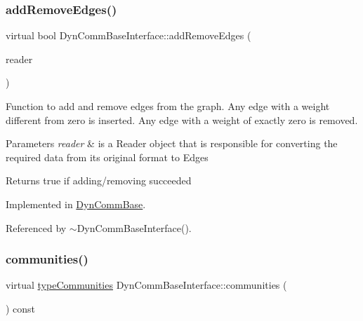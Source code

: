 \subsubsection{\texorpdfstring{add\+Remove\+Edges()}{addRemoveEdges()}}
{\footnotesize\ttfamily virtual bool Dyn\+Comm\+Base\+Interface\+::add\+Remove\+Edges (\begin{DoxyParamCaption}\item[{\hyperlink{DynCommBaseInterface_8h_a78c081a2dec12142bd4225d9ee662d82}{Reader\+Edge\+Base} $\ast$}]{reader }\end{DoxyParamCaption})\hspace{0.3cm}{\ttfamily [pure virtual]}}

Function to add and remove edges from the graph. Any edge with a weight different from zero is inserted. Any edge with a weight of exactly zero is removed.


\begin{DoxyParams}{Parameters}
{\em reader} & is a Reader object that is responsible for converting the required data from its original format to Edges \\
\hline
\end{DoxyParams}
\begin{DoxyReturn}{Returns}
true if adding/removing succeeded 
\end{DoxyReturn}


Implemented in \hyperlink{classDynCommBase_a85ff9898ef25b12f3e80842c7b2696fe}{Dyn\+Comm\+Base}.



Referenced by $\sim$\+Dyn\+Comm\+Base\+Interface().

\mbox{\label{classDynCommBaseInterface_aedba7e43ae301ab910340f1d766d1698}} 
\subsubsection{\texorpdfstring{communities()}{communities()}}
{\footnotesize\ttfamily virtual \hyperlink{graphUndirectedGroupable_8h_ab79c7252155ca17cb49aa0b1fea30116}{type\+Communities} Dyn\+Comm\+Base\+Interface\+::communities (\begin{DoxyParamCaption}{ }\end{DoxyParamCaption}) const\hspace{0.3cm}{\ttfamily [pure virtual]}}

